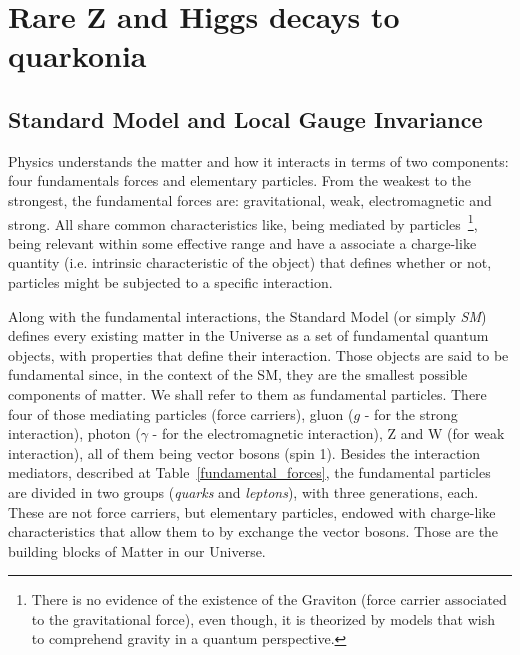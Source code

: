 \chapter{Rare Z and Higgs decays to quarkonia}

\section{Standard Model and Local Gauge Invariance}

 
Physics understands the matter and how it interacts in terms of two components: four fundamentals forces and elementary particles. From the weakest to the strongest, the fundamental forces are: gravitational, weak, electromagnetic and strong. All share common characteristics like, being mediated by particles~\footnote{There is no evidence of the existence of the Graviton (force carrier associated to the gravitational force), even though, it is theorized by models that wish to comprehend gravity in a quantum perspective.}, being relevant within some effective range and have a associate a charge-like quantity (i.e. intrinsic characteristic of the object) that defines whether or not, particles might be subjected to a specific interaction.

Along with the fundamental interactions, the Standard Model (or simply \textit{SM}) defines every existing matter in the Universe as a set of fundamental quantum objects, with properties that define their interaction. Those objects are said to be fundamental since, in the context of the SM, they are the smallest possible components of matter. We shall refer to them as fundamental particles. There four of those mediating particles (force carriers), gluon ($g$ - for the strong interaction), photon ($\gamma$ - for the electromagnetic interaction), Z and W (for weak interaction), all of them being vector bosons (spin 1). Besides the interaction mediators, described at Table~\ref{fundamental_forces}, the fundamental particles are divided in two groups (\textit{quarks} and \textit{leptons}), with three generations, each. These are not force carriers, but elementary particles, endowed with charge-like characteristics that allow them to by exchange the vector bosons. Those are the building blocks of Matter in our Universe.

